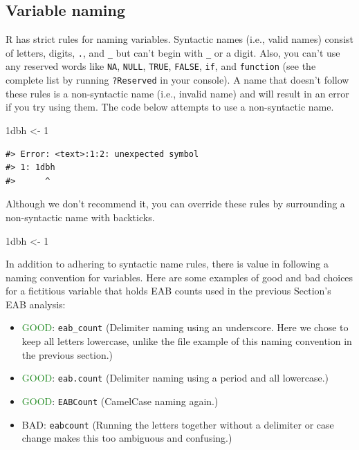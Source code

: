 \documentclass[
  11pt,
]{krantz}
\newenvironment{Shaded}{\begin{snugshade}}{\end{snugshade}}
\newcommand{\DataTypeTok}[1]{\textcolor[rgb]{0.13,0.29,0.53}{#1}}
\newcommand{\DecValTok}[1]{\textcolor[rgb]{0.00,0.00,0.81}{#1}}
\newcommand{\NormalTok}[1]{#1}
\newcommand{\StringTok}[1]{\textcolor[rgb]{0.31,0.60,0.02}{#1}}
\providecommand{\tightlist}{%
  \setlength{\itemsep}{0pt}\setlength{\parskip}{0pt}}
\theoremstyle{definition}
\theoremstyle{definition}
\theoremstyle{definition}
\theoremstyle{definition}
\theoremstyle{remark}
\begin{document}
\hypertarget{syntacticNames}{%
\subsection{Variable naming}\label{syntacticNames}}

R has strict rules for naming variables. Syntactic names (i.e., valid names) consist of letters, digits, \texttt{.}, and \texttt{\_} but can't begin with \texttt{\_} or a digit. Also, you can't use any reserved words like \texttt{NA}, \texttt{NULL}, \texttt{TRUE}, \texttt{FALSE}, \texttt{if}, and \texttt{function} (see the complete list by running \texttt{?Reserved} in your console). A name that doesn't follow these rules is a non-syntactic name (i.e., invalid name) and will result in an error if you try using them. The code below attempts to use a non-syntactic name.

\begin{Shaded}
\begin{Highlighting}[]
\NormalTok{1dbh \textless{}{-}}\StringTok{ }\DecValTok{1}
\end{Highlighting}
\end{Shaded}

\begin{verbatim}
#> Error: <text>:1:2: unexpected symbol
#> 1: 1dbh
#>      ^
\end{verbatim}

Although we don't recommend it, you can override these rules by surrounding a non-syntactic name with backticks.

\begin{Shaded}
\begin{Highlighting}[]
\StringTok{\textasciigrave{}}\DataTypeTok{1dbh}\StringTok{\textasciigrave{}}\NormalTok{ \textless{}{-}}\StringTok{ }\DecValTok{1}
\end{Highlighting}
\end{Shaded}

In addition to adhering to syntactic name rules, there is value in following a naming convention for variables. Here are some examples of good and bad choices for a fictitious variable that holds EAB counts used in the previous Section's EAB analysis:

\begin{itemize}
\tightlist
\item
  \textcolor{ForestGreen}{GOOD}: \texttt{eab\_count} (Delimiter naming using an underscore. Here we chose to keep all letters lowercase, unlike the file example of this naming convention in the previous section.)
\item
  \textcolor{ForestGreen}{GOOD}: \texttt{eab.count} (Delimiter naming using a period and all lowercase.)
\item
  \textcolor{ForestGreen}{GOOD}: \texttt{EABCount} (CamelCase naming again.)
\item
  \textcolor{RedOrange}{BAD}: \texttt{eabcount} (Running the letters together without a delimiter or case change makes this too ambiguous and confusing.)
\end{itemize}
\end{document}

